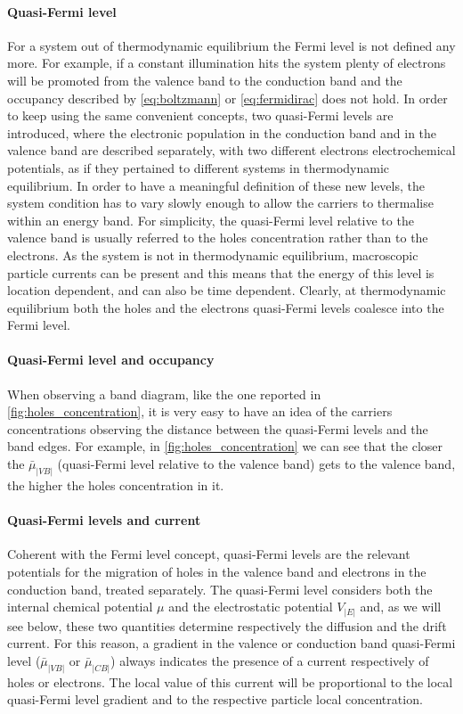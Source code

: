 		\paragraph{Quasi-Fermi level}
		For a system out of thermodynamic equilibrium the Fermi level is not defined any more.
		For example, if a constant illumination hits the system plenty of electrons will be promoted from the valence band to the conduction band and the occupancy described by \cref{eq:boltzmann} or \cref{eq:fermidirac} does not hold.
		In order to keep using the same convenient concepts, two quasi\hyp{}Fermi levels are introduced, where the electronic population in the conduction band and in the valence band are described separately, with two different electrons electrochemical potentials, as if they pertained to different systems in thermodynamic equilibrium.
		In order to have a meaningful definition of these new levels, the system condition has to vary slowly enough to allow the carriers to thermalise within an energy band.
		For simplicity, the quasi-Fermi level relative to the valence band is usually referred to the holes concentration rather than to the electrons.
		As the system is not in thermodynamic equilibrium, macroscopic particle currents can be present and this means that the energy of this level is location dependent, and can also be time dependent.
		Clearly, at thermodynamic equilibrium both the holes and the electrons quasi\hyp{}Fermi levels coalesce into the Fermi level.
		
		\paragraph{Quasi-Fermi level and occupancy}
		When observing a band diagram, like the one reported in \cref{fig:holes_concentration}, it is very easy to have an idea of the carriers concentrations observing the distance between the quasi\hyp{}Fermi levels and the band edges.
		For example, in \cref{fig:holes_concentration} we can see that the closer the $\bar\mu_|VB|$ (quasi\hyp{}Fermi level relative to the valence band) gets to the valence band, the higher the holes concentration in it.
		
		\paragraph{Quasi\hyp{}Fermi levels and current}
		Coherent with the Fermi level concept, quasi-Fermi levels are the relevant potentials for the migration of holes in the valence band and electrons in the conduction band, treated separately.
		The quasi\hyp{}Fermi level considers both the internal chemical potential $\mu$ and the electrostatic potential $V_|E|$ and, as we will see below, these two quantities determine respectively the diffusion and the drift current.
		For this reason, a gradient in the valence or conduction band quasi\hyp{}Fermi level ($\bar\mu_|VB|$ or $\bar\mu_|CB|$) always indicates the presence of a current respectively of holes or electrons.
		The local value of this current will be proportional to the local quasi\hyp{}Fermi level gradient and to the respective particle local concentration.
		
